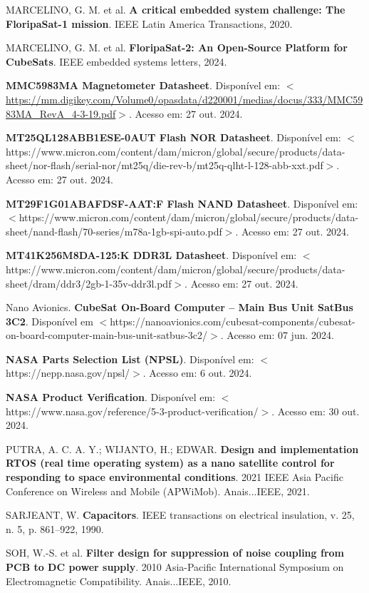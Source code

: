 \begin{flushleft}
\begin{thebibliography}{00}
 MARCELINO, G. M. et al. \textbf{A critical embedded system challenge: The FloripaSat-1 mission}. IEEE Latin America Transactions, 2020.

 MARCELINO, G. M. et al. \textbf{FloripaSat-2: An Open-Source Platform for CubeSats}. IEEE embedded systems letters, 2024.

 \textbf{MMC5983MA Magnetometer Datasheet}. Disponível em: $<$\url{https://mm.digikey.com/Volume0/opasdata/d220001/medias/docus/333/MMC5983MA\_RevA\_4-3-19.pdf}$>$. Acesso em: 27 out. 2024. 

 \textbf{MT25QL128ABB1ESE-0AUT Flash NOR Datasheet}. Disponível em: $<$https://www.micron.com/content/dam/micron/global/secure/products/data-sheet/nor-flash/serial-nor/mt25q/die-rev-b/mt25q-qlht-l-128-abb-xxt.pdf$>$. Acesso em: 27 out. 2024. 

 \textbf{MT29F1G01ABAFDSF-AAT:F Flash NAND Datasheet}. Disponível em: $<$https://www.micron.com/content/dam/micron/global/secure/products/data-sheet/nand-flash/70-series/m78a-1gb-spi-auto.pdf$>$. Acesso em: 27 out. 2024. 

 \textbf{MT41K256M8DA-125:K DDR3L Datasheet}. Disponível em: $<$https://www.micron.com/content/dam/micron/global/secure/products/data-sheet/dram/ddr3/2gb-1-35v-ddr3l.pdf$>$. Acesso em: 27 out. 2024. 

 Nano Avionics. \textbf{CubeSat On-Board Computer – Main Bus Unit SatBus 3C2}. Disponível em $<$https://nanoavionics.com/cubesat-components/cubesat-on-board-computer-main-bus-unit-satbus-3c2/$>$. Acesso em: 07 jun. 2024.

 \textbf{NASA Parts Selection List (NPSL)}. Disponível em: $<$https://nepp.nasa.gov/npsl/$>$. Acesso em: 6 out. 2024.

 \textbf{NASA Product Verification}. Disponível em: $<$https://www.nasa.gov/reference/5-3-product-verification/$>$. Acesso em: 30 out. 2024.

 PUTRA, A. C. A. Y.; WIJANTO, H.; EDWAR. \textbf{Design and implementation RTOS (real time operating system) as a nano satellite control for responding to space environmental conditions}. 2021 IEEE Asia Pacific Conference on Wireless and Mobile (APWiMob). Anais...IEEE, 2021.

 SARJEANT, W. \textbf{Capacitors}. IEEE transactions on electrical insulation, v. 25, n. 5, p. 861–922, 1990.

 SOH, W.-S. et al. \textbf{Filter design for suppression of noise coupling from PCB to DC power supply}. 2010 Asia-Pacific International Symposium on Electromagnetic Compatibility. Anais...IEEE, 2010.


\end{thebibliography}
\end{flushleft}
